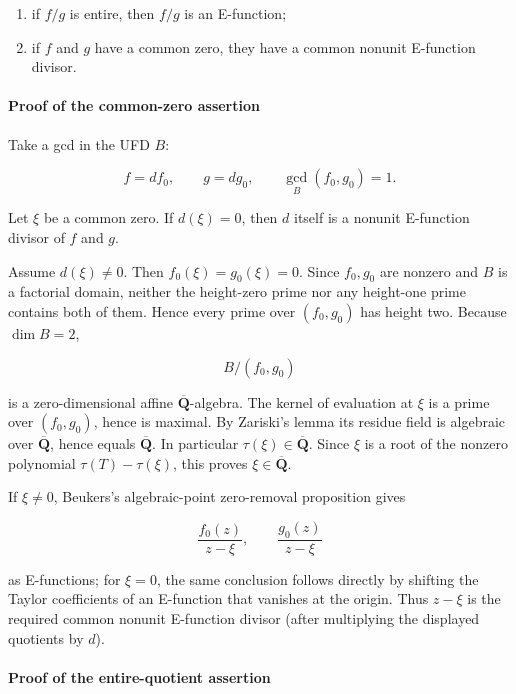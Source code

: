 \documentclass[11pt]{article}
\theoremstyle{keio}
\theoremstyle{definition}
\theoremstyle{remark}
\providecommand{\tightlist}{\setlength{\itemsep}{0pt}\setlength{\parskip}{0pt}}
\begin{document}
\begin{enumerate}
\def\labelenumi{\arabic{enumi}.}
\tightlist
\item
  if \(f/g\) is entire, then \(f/g\) is an E-function;
\item
  if \(f\) and \(g\) have a common zero, they have a common nonunit
  E-function divisor.
\end{enumerate}

\paragraph{Proof of the common-zero assertion}

Take a gcd in the UFD \(B\):

\[
  f=df_0,\qquad g=dg_0,\qquad \gcd_B(f_0,g_0)=1.             \tag{J-2A.1}
\]

Let \(\xi\) be a common zero. If \(d(\xi)=0\), then \(d\) itself is a
nonunit E-function divisor of \(f\) and \(g\).

Assume \(d(\xi)\ne0\). Then \(f_0(\xi)=g_0(\xi)=0\). Since \(f_0,g_0\)
are nonzero and \(B\) is a factorial domain, neither the height-zero prime nor
any height-one prime contains both of them. Hence every prime over
\((f_0,g_0)\) has height two. Because \(\dim B=2\),

\[
  B/(f_0,g_0)
\]

is a zero-dimensional affine \(\overline{\mathbf Q}\)-algebra. The kernel
of evaluation at \(\xi\) is a prime over \((f_0,g_0)\), hence is maximal.
By Zariski's lemma its residue field is algebraic over
\(\overline{\mathbf Q}\), hence equals \(\overline{\mathbf Q}\). In particular
\(\tau(\xi)\in\overline{\mathbf Q}\). Since \(\xi\) is a root of the
nonzero polynomial \(\tau(T)-\tau(\xi)\), this proves
\(\xi\in\overline{\mathbf Q}\).

If \(\xi\ne0\), Beukers's algebraic-point zero-removal proposition gives

\[
  \frac{f_0(z)}{z-\xi},\qquad
  \frac{g_0(z)}{z-\xi}
\]

as E-functions; for \(\xi=0\), the same conclusion follows directly by
shifting the Taylor coefficients of an E-function that vanishes at the
origin. Thus \(z-\xi\) is the required common nonunit E-function
divisor (after multiplying the displayed quotients by \(d\)).

\paragraph{Proof of the entire-quotient assertion}
\end{document}

